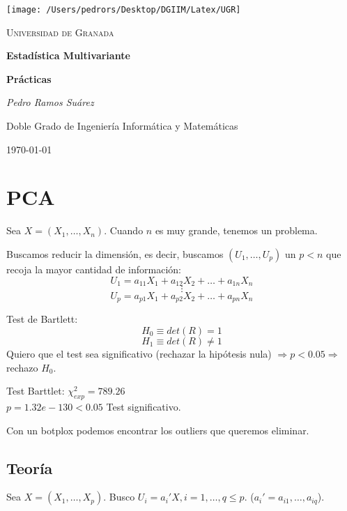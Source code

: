 \documentclass[11pt,a4paper]{article}
\begin{document}
\begin{titlepage}
\centering
\texttt{[image: /Users/pedrors/Desktop/DGIIM/Latex/UGR]}\par\vspace{1cm}
{\scshape\LARGE Universidad de Granada \par}
\vspace{1cm}
\vspace{1.5cm}
{\huge\bfseries Estadística Multivariante\par}
\vspace{1cm}
{\large\bfseries Prácticas\par}
\vspace{2cm}
{\Large\itshape Pedro Ramos Suárez\par}
\vfill
Doble Grado de Ingeniería Informática y Matemáticas
\vfill
{\large \today\par}
\end{titlepage}

\tableofcontents
\newpage

\section{PCA}

Sea $X = (X_{1}, \dots, X_{n})$. Cuando $n$ es muy grande, tenemos un problema.

Buscamos reducir la dimensión, es decir, buscamos $(U_{1}, \dots, U_{p})$ un $p < n$ que recoja la mayor cantidad de información:
$$U_{1} = a_{11}X_{1} + a_{12}X_{2} + \dots + a_{1n}X_{n}$$
$$\vdots$$
$$U_{p} = a_{p1}X_{1} + a_{p2}X_{2} + \dots + a_{pn}X_{n}$$

Test de Bartlett:
$$H_{0} \equiv det(R) = 1$$
$$H_{1} \equiv det(R) \neq 1$$
Quiero que el test sea significativo (rechazar la hipótesis nula) $\Rightarrow p < 0.05 \Rightarrow$ rechazo $H_{0}$.

Test Barttlet: $\chi^{2}_{exp} = 789.26$ \\
$p = 1.32e-130 < 0.05$ Test significativo.

Con un botplox podemos encontrar los outliers que queremos eliminar.

\subsection{Teoría}

Sea $X = (X_{1}, \dots, X_{p})$. Busco $U_{i} = a_{i}'X, i=1, \dots, q \leq p$. ($a_{i}' = a_{i1}, \dots, a_{iq}$).
\end{document}
